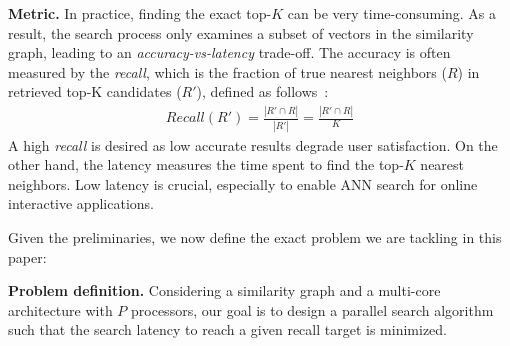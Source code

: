 

\noindent
\textbf{Metric.} In practice, finding the exact top-$K$ can be very time-consuming. As a result, the search process only examines a subset of vectors in the similarity graph, leading to an \emph{accuracy-vs-latency} trade-off. The accuracy is often measured by the \emph{recall}, which is the fraction of true nearest neighbors ($R$) in retrieved top-K candidates ($R'$), defined as follows~\cite{fu2016efanna}:
\begin{align} \label{formula:recall}
    Recall(R') = \frac{\left | R' \cap R \right |}{\left | R' \right |} = \frac{\left | R' \cap R \right |}{K}
\end{align}
A high \emph{recall} is desired as low accurate results degrade user satisfaction.
On the other hand, the latency measures the time spent to find the top-$K$ nearest neighbors. Low latency is crucial, especially to enable ANN search for online interactive applications. 

Given the preliminaries, we now define the exact problem we are tackling in this paper:

\noindent
\textbf{Problem definition.} Considering a similarity graph and a multi-core architecture with $P$ processors, our goal is to design a parallel search algorithm such that the search latency to reach a given recall target is minimized. 






